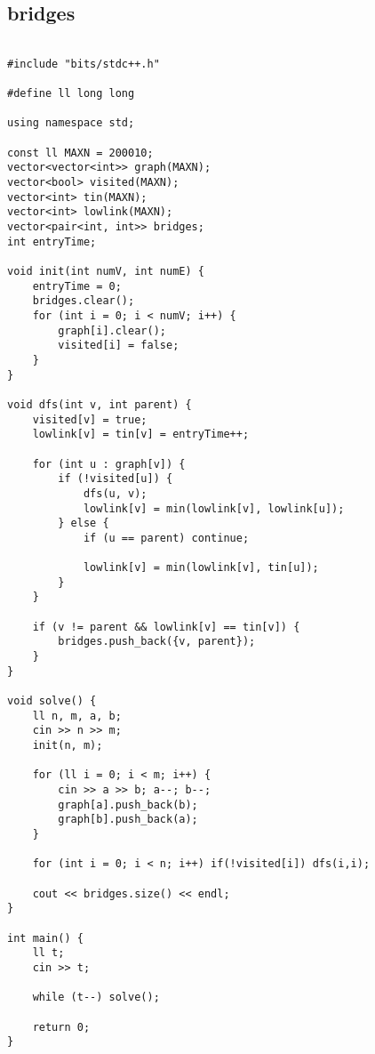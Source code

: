 \documentclass[landscape,twocolumn,10pt,a4paper]{article}
\begin{document}
\subsection{bridges}
\begin{verbatim}

#include "bits/stdc++.h"

#define ll long long

using namespace std;

const ll MAXN = 200010;
vector<vector<int>> graph(MAXN);
vector<bool> visited(MAXN);
vector<int> tin(MAXN);
vector<int> lowlink(MAXN);
vector<pair<int, int>> bridges;
int entryTime;

void init(int numV, int numE) {
    entryTime = 0;
    bridges.clear();
    for (int i = 0; i < numV; i++) {
        graph[i].clear();
        visited[i] = false;
    }
}

void dfs(int v, int parent) {
    visited[v] = true;
    lowlink[v] = tin[v] = entryTime++;

    for (int u : graph[v]) {
        if (!visited[u]) {
            dfs(u, v);
            lowlink[v] = min(lowlink[v], lowlink[u]);
        } else {
            if (u == parent) continue;

            lowlink[v] = min(lowlink[v], tin[u]);
        }
    }

    if (v != parent && lowlink[v] == tin[v]) {
        bridges.push_back({v, parent});
    }
}

void solve() {
    ll n, m, a, b;
    cin >> n >> m;
    init(n, m);

    for (ll i = 0; i < m; i++) {
        cin >> a >> b; a--; b--;
        graph[a].push_back(b);
        graph[b].push_back(a);
    }

    for (int i = 0; i < n; i++) if(!visited[i]) dfs(i,i);

    cout << bridges.size() << endl;        
}

int main() {
    ll t;
    cin >> t;

    while (t--) solve();

    return 0;
}\end{verbatim}
\end{document}
